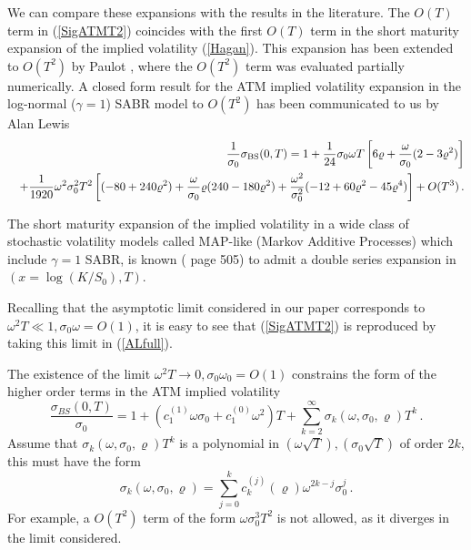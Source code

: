\documentclass[11pt]{article}
\numberwithin{equation}{section}
\theoremstyle{plain}
\begin{document}
We can compare these expansions with the results in the literature. 
The $O(T)$ term in (\ref{SigATMT2}) coincides with the first $O(T)$ term in the
short maturity expansion of the implied volatility (\ref{Hagan}).
This expansion has been extended to $O(T^2)$ by Paulot \cite{Paulot},
where the $O(T^2)$ term was evaluated partially numerically. 
A closed form result for the ATM implied volatility expansion in the 
log-normal ($\gamma=1$) SABR model to $O(T^2)$ has been communicated to us 
by Alan Lewis \cite{LewisUnpublished}
\begin{eqnarray}\label{ALfull}
&& \frac{1}{\sigma_0} \sigma_{\rm BS}(0,T) =
1 + \frac{1}{24} \sigma_0 \omega T
\left[6 \varrho  + \frac{\omega}{\sigma_0} (2- 3 \varrho^2) \right]  \\
&& + \frac{1}{1920} \omega^2 \sigma_0^2 T^2
\left[
(-80 + 240 \varrho^2 ) +
\frac{\omega}{\sigma_0} \varrho (240 - 180 \varrho^2) +
\frac{\omega^2}{\sigma_0^2} (-12 + 60 \varrho^2 - 45 \varrho^4) 
\right] +  O(T^3) \,.\nonumber
\end{eqnarray}


The short maturity expansion of the implied volatility in 
a wide class of stochastic volatility models called MAP-like 
(Markov Additive Processes)
which include $\gamma=1$ SABR, is known (\cite{Lewis2017} page 505) 
to admit a double series expansion in $(x=\log(K/S_0),T)$.

Recalling that the asymptotic limit considered
in our paper corresponds to $\omega^2 T  \ll 1, \sigma_0 \omega=O(1)$,
it is easy to see that (\ref{SigATMT2}) is reproduced by taking this
limit in (\ref{ALfull}).

The existence of the limit $\omega^2 T \to 0, \sigma_0 \omega_0 = O(1)$
constrains the form of the higher order terms in the ATM implied volatility
\begin{equation}
\frac{\sigma_{BS}(0,T)}{\sigma_0} = 
1 + \left(c_1^{(1)} \omega\sigma_0 + c_1^{(0)} \omega^2\right) T + 
\sum_{k=2}^\infty \sigma_k(\omega,\sigma_0,\varrho) T^k \,.
\end{equation}
Assume that $\sigma_k(\omega,\sigma_0,\varrho) T^k$ is a polynomial in 
$(\omega \sqrt{T}), (\sigma_0 \sqrt{T})$ of order $2k$, this must have the form
\begin{equation}
\sigma_k(\omega,\sigma_0,\varrho) = \sum_{j=0}^{k} c_k^{(j)}(\varrho) 
\omega^{2k-j} \sigma_0^{j}\,.
\end{equation}
For example, a $O(T^2)$ term of the form $\omega \sigma_0^3 T^2$ 
is not allowed, as it diverges in the limit considered.
\end{document}

